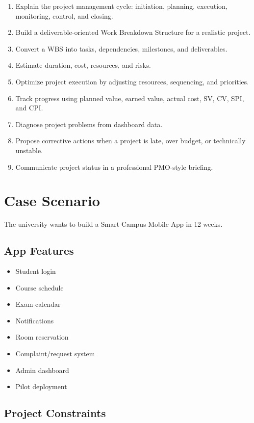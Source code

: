 \documentclass[11pt,a4paper]{article}
\begin{document}
\begin{enumerate}
  \item Explain the project management cycle: initiation, planning, execution, monitoring, control, and closing.
  \item Build a deliverable-oriented Work Breakdown Structure for a realistic project.
  \item Convert a WBS into tasks, dependencies, milestones, and deliverables.
  \item Estimate duration, cost, resources, and risks.
  \item Optimize project execution by adjusting resources, sequencing, and priorities.
  \item Track progress using planned value, earned value, actual cost, SV, CV, SPI, and CPI.
  \item Diagnose project problems from dashboard data.
  \item Propose corrective actions when a project is late, over budget, or technically unstable.
  \item Communicate project status in a professional PMO-style briefing.
\end{enumerate}

\section*{Case Scenario}

The university wants to build a Smart Campus Mobile App in 12 weeks.

\subsection*{App Features}

\begin{itemize}
  \item Student login
  \item Course schedule
  \item Exam calendar
  \item Notifications
  \item Room reservation
  \item Complaint/request system
  \item Admin dashboard
  \item Pilot deployment
\end{itemize}

\subsection*{Project Constraints}
\end{document}
